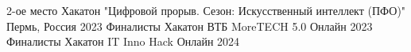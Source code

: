 
\begin{cvhonors}

  \cvhonor
    {2-ое место} %
    {Хакатон "Цифровой прорыв. Сезон: Искусственный интеллект (ПФО)"} %
    {Пермь, Россия} %
    {2023} %
  \cvhonor
    {Финалисты} %
    {Хакатон ВТБ MoreTECH 5.0} %
    {Онлайн} %
    {2023} %
  \cvhonor
    {Финалисты} %
    {Хакатон IT Inno Hack} %
    {Онлайн} %
    {2024} %
\end{cvhonors}

